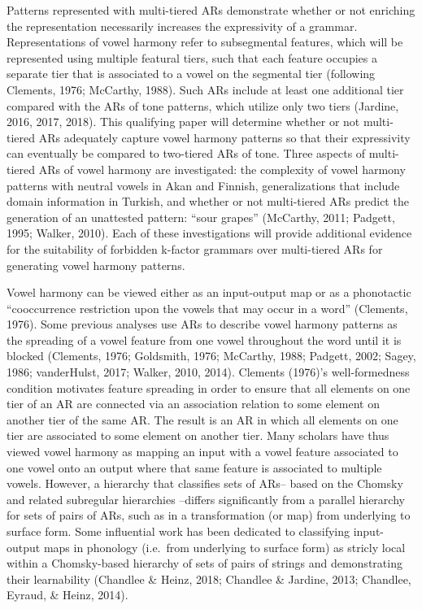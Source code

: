 \documentclass[,doc,floatsintext]{apa6}
\theoremstyle{definition}
\theoremstyle{definition}
\theoremstyle{definition}
\theoremstyle{remark}
\begin{document}
Patterns represented with multi-tiered ARs demonstrate whether or not
enriching the representation necessarily increases the expressivity of a
grammar. Representations of vowel harmony refer to subsegmental
features, which will be represented using multiple featural tiers, such
that each feature occupies a separate tier that is associated to a vowel
on the segmental tier (following Clements, 1976; McCarthy, 1988). Such
ARs include at least one additional tier compared with the ARs of tone
patterns, which utilize only two tiers (Jardine, 2016, 2017, 2018). This
qualifying paper will determine whether or not multi-tiered ARs
adequately capture vowel harmony patterns so that their expressivity can
eventually be compared to two-tiered ARs of tone. Three aspects of
multi-tiered ARs of vowel harmony are investigated: the complexity of
vowel harmony patterns with neutral vowels in Akan and Finnish,
generalizations that include domain information in Turkish, and whether
or not multi-tiered ARs predict the generation of an unattested pattern:
\enquote{sour grapes} (McCarthy, 2011; Padgett, 1995; Walker, 2010).
Each of these investigations will provide additional evidence for the
suitability of forbidden k-factor grammars over multi-tiered ARs for
generating vowel harmony patterns.

Vowel harmony can be viewed either as an input-output map or as a
phonotactic \enquote{cooccurrence restriction upon the vowels that may
occur in a word} (Clements, 1976). Some previous analyses use ARs to
describe vowel harmony patterns as the spreading of a vowel feature from
one vowel throughout the word until it is blocked (Clements, 1976;
Goldsmith, 1976; McCarthy, 1988; Padgett, 2002; Sagey, 1986;
vanderHulst, 2017; Walker, 2010, 2014). Clements (1976)'s
well-formedness condition motivates feature spreading in order to ensure
that all elements on one tier of an AR are connected via an association
relation to some element on another tier of the same AR. The result is
an AR in which all elements on one tier are associated to some element
on another tier. Many scholars have thus viewed vowel harmony as mapping
an input with a vowel feature associated to one vowel onto an output
where that same feature is associated to multiple vowels. However, a
hierarchy that classifies sets of ARs-- based on the Chomsky and related
subregular hierarchies --differs significantly from a parallel hierarchy
for sets of pairs of ARs, such as in a transformation (or map) from
underlying to surface form. Some influential work has been dedicated to
classifying input-output maps in phonology (i.e.~from underlying to
surface form) as stricly local within a Chomsky-based hierarchy of sets
of pairs of strings and demonstrating their learnability (Chandlee \&
Heinz, 2018; Chandlee \& Jardine, 2013; Chandlee, Eyraud, \& Heinz,
2014).
\end{document}
